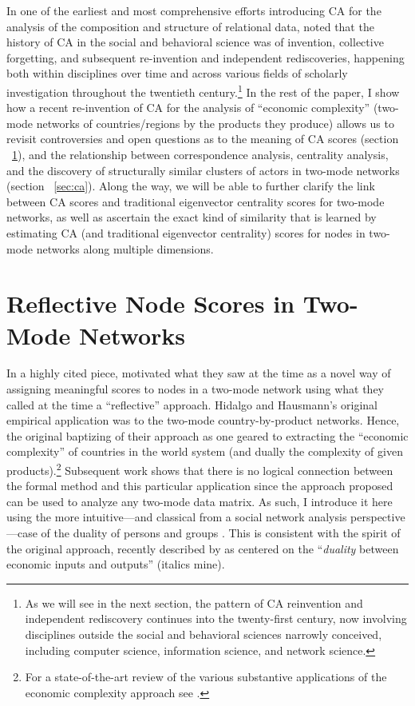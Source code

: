 \documentclass[a4paper,fleqn]{cas-sc}
\begin{document}
In one of the earliest and most comprehensive efforts introducing CA for the analysis of the composition and structure of relational data, \citet[19-21]{wasserman1990correspondence} noted that the history of CA in the social and behavioral science was of invention, collective forgetting, and subsequent re-invention and independent rediscoveries, happening both within disciplines over time and across various fields of scholarly investigation throughout the twentieth century.\footnote{As we will see in the next section, the pattern of CA reinvention and independent rediscovery continues into the twenty-first century, now involving disciplines outside the social and behavioral sciences narrowly conceived, including computer science, information science, and network science.} In the rest of the paper, I show how a recent re-invention of CA for the analysis of ``economic complexity'' (two-mode networks of countries/regions by the products they produce) allows us to revisit controversies and open questions as to the meaning of CA scores (section ~\ref{sec:ref2mode}), and the relationship between correspondence analysis, centrality analysis, and the discovery of structurally similar clusters of actors in two-mode networks (section ~\ref{sec:ca}). Along the way, we will be able to further clarify the link between CA scores and traditional eigenvector centrality scores for two-mode networks, as well as ascertain the exact kind of similarity that is learned by estimating CA (and traditional eigenvector centrality) scores for nodes in two-mode networks along multiple dimensions. 

\section{Reflective Node Scores in Two-Mode Networks} \label{sec:ref2mode}
In a highly cited piece, \citet{hidalgo2009building} motivated what they saw at the time as a novel way of assigning meaningful scores to nodes in a two-mode network using what they called at the time a ``reflective'' approach. Hidalgo and Hausmann's original empirical application was to the two-mode country-by-product networks. Hence, the original baptizing of their approach as one geared to extracting the ``economic complexity'' of countries in the world system (and dually the complexity of given products).\footnote{For a state-of-the-art review of the various substantive applications of the economic complexity approach see \citet{hidalgo2021economic}.} Subsequent work shows that there is no logical connection between the formal method and this particular application since the approach proposed can be used to analyze any two-mode data matrix. As such, I introduce it here using the more intuitive---and classical from a social network analysis perspective---case of the duality of persons and groups \citep{breiger1974duality}. This is consistent with the spirit of the original approach, recently described by \citet[92]{hidalgo2021economic} as centered on the ``\textit{duality} between economic inputs and outputs'' (italics mine).
\end{document}
